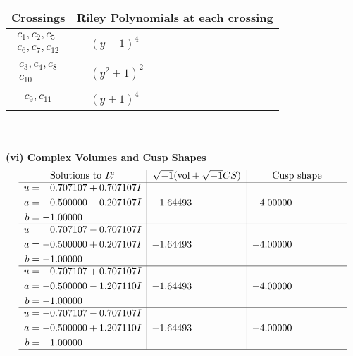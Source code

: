 \documentclass[1p]{elsarticle_modified}
\theoremstyle{definition}
\newcommand{\I}{\sqrt{-1}}
\begin{document}
\begin{tabular}{m{50pt}|m{274pt}}
Crossings & \hspace{64pt}Riley Polynomials at each crossing \\
\hline $$\begin{aligned}c_{1},c_{2},c_{5}\\c_{6},c_{7},c_{12}\end{aligned}$$&$\begin{aligned}
&(y-1)^4
\end{aligned}$\\
\hline $$\begin{aligned}c_{3},c_{4},c_{8}\\c_{10}\end{aligned}$$&$\begin{aligned}
&(y^2+1)^2
\end{aligned}$\\
\hline $$\begin{aligned}c_{9},c_{11}\end{aligned}$$&$\begin{aligned}
&(y+1)^4
\end{aligned}$\\
\hline
\end{tabular}\\~\\
\newpage\flushleft \textbf{(vi) Complex Volumes and Cusp Shapes}
$$\begin{array}{c|c|c}  
\text{Solutions to }I^u_{7}& \I (\text{vol} + \sqrt{-1}CS) & \text{Cusp shape}\\
 \hline 
\begin{aligned}
u &= \phantom{-}0.707107 + 0.707107 I \\
a &= -0.500000 - 0.207107 I \\
b &= -1.00000\phantom{ +0.000000I}\end{aligned}
 & -1.64493\phantom{ +0.000000I} & -4.00000\phantom{ +0.000000I} \\ \hline\begin{aligned}
u &= \phantom{-}0.707107 - 0.707107 I \\
a &= -0.500000 + 0.207107 I \\
b &= -1.00000\phantom{ +0.000000I}\end{aligned}
 & -1.64493\phantom{ +0.000000I} & -4.00000\phantom{ +0.000000I} \\ \hline\begin{aligned}
u &= -0.707107 + 0.707107 I \\
a &= -0.500000 - 1.207110 I \\
b &= -1.00000\phantom{ +0.000000I}\end{aligned}
 & -1.64493\phantom{ +0.000000I} & -4.00000\phantom{ +0.000000I} \\ \hline\begin{aligned}
u &= -0.707107 - 0.707107 I \\
a &= -0.500000 + 1.207110 I \\
b &= -1.00000\phantom{ +0.000000I}\end{aligned}
 & -1.64493\phantom{ +0.000000I} & -4.00000\phantom{ +0.000000I}\\
 \hline 
 \end{array}$$\newpage\newpage\renewcommand{\arraystretch}{1}
\end{document}
